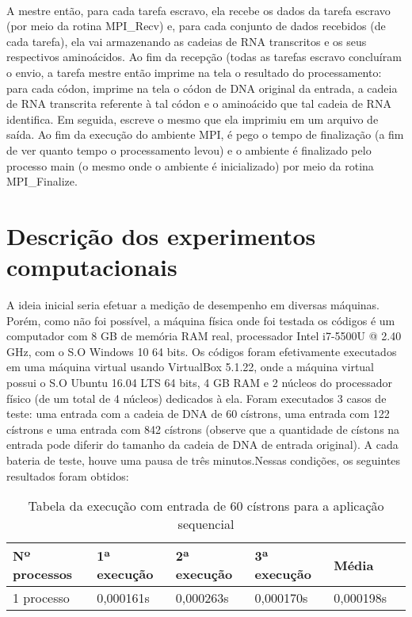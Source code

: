 \documentclass[a4paper,10pt]{article}
\begin{document}
\paragraph{} A mestre então, para cada tarefa escravo, ela recebe os dados da tarefa escravo (por meio da rotina MPI\_Recv) e, para cada conjunto de dados recebidos (de cada tarefa), ela vai armazenando as cadeias de RNA transcritos e os seus respectivos aminoácidos. Ao fim da recepção (todas as tarefas escravo concluíram o envio, a tarefa mestre então imprime na tela o resultado do processamento: para cada códon, imprime na tela o códon de DNA original da entrada, a cadeia de RNA transcrita referente à tal códon e o aminoácido que tal cadeia de RNA identifica. Em seguida, escreve o mesmo que ela imprimiu em um arquivo de saída. Ao fim da execução do ambiente MPI, é pego o tempo de finalização (a fim de ver quanto tempo o processamento levou) e o ambiente é finalizado pelo processo main (o mesmo onde o ambiente é inicializado) por meio da rotina MPI\_Finalize.\\

\newpage

\section{Descrição dos experimentos computacionais}
A ideia inicial seria efetuar a medição de desempenho em diversas máquinas. Porém, como não foi possível, a máquina física onde foi testada os códigos é um computador com 8 GB de memória RAM real, processador Intel i7-5500U @ 2.40 GHz, com o S.O Windows 10 64 bits. Os códigos foram efetivamente executados em uma máquina virtual usando VirtualBox 5.1.22, onde a máquina virtual possui o S.O Ubuntu 16.04 LTS 64 bits, 4 GB RAM e 2 núcleos do processador físico (de um total de 4 núcleos) dedicados à ela. Foram executados 3 casos de teste: uma entrada com a cadeia de DNA de 60 cístrons, uma entrada com 122 cístrons e uma entrada com 842 cístrons (observe que a quantidade de cístons na entrada pode diferir do tamanho da cadeia de DNA de  entrada original). A cada bateria de teste, houve uma pausa de três minutos.Nessas condições, os seguintes resultados foram obtidos:\\

\begin{table}[!htb]
\begin{tabular}{| l | l | l | l | l | p{5cm} |} 
\hline
  Nº processos & 1ª execução & 2ª execução & 3ª execução & Média\\ \hline
1 processo   &	0,000161s  &    0,000263s    & 0,000170s   &  0,000198s\\ \hline

\end{tabular}
\caption{Tabela da execução com entrada de 60 cístrons para a aplicação sequencial}
\end{table}
\end{document}
